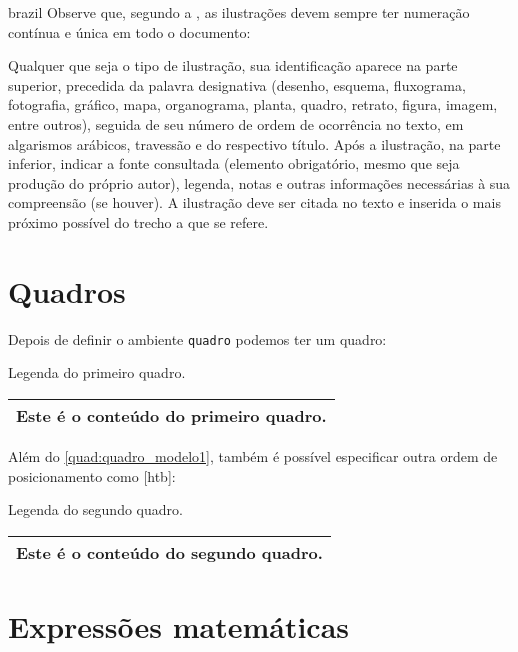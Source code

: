 \begin{otherlanguage*}{brazil}
Observe que, segundo a \textcite[seções 4.2.1.10 e 5.8]{NBR14724:2011}, as
ilustrações devem sempre ter numeração contínua e única em todo o documento:

\begin{citacao}
Qualquer que seja o tipo de ilustração, sua identificação aparece na parte
superior, precedida da palavra designativa (desenho, esquema, fluxograma,
fotografia, gráfico, mapa, organograma, planta, quadro, retrato, figura,
imagem, entre outros), seguida de seu número de ordem de ocorrência no texto,
em algarismos arábicos, travessão e do respectivo título. Após a ilustração, na
parte inferior, indicar a fonte consultada (elemento obrigatório, mesmo que
seja produção do próprio autor), legenda, notas e outras informações
necessárias à sua compreensão (se houver). A ilustração deve ser citada no
texto e inserida o mais próximo possível do trecho a que se
refere. \cite[seções 5.8]{NBR14724:2011}
\end{citacao}

\section{Quadros}

Depois de definir o ambiente \texttt{quadro} podemos ter um quadro:

\begin{board}
\caption{\label{quad:quadro_modelo1}Legenda do primeiro quadro.}
\centering
\begin{tabular}{|c|}
\hline
Este é o conteúdo do primeiro quadro.\\
\hline
\end{tabular}
\end{board}


Além do \autoref{quad:quadro_modelo1}, também é possível especificar outra ordem de posicionamento como [htb]:

\begin{board}[htb]
\centering
\caption{\label{quad:quadro_modelo2}Legenda do segundo quadro.}
\begin{tabular}{|c|}
\hline
Este é o conteúdo do segundo quadro.\\
\hline
\end{tabular}
\end{board}



\section{Expressões matemáticas}


\end{otherlanguage*}
